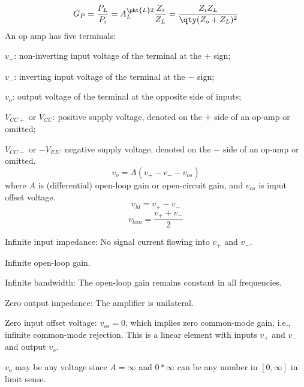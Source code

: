 \documentclass[a4paper,12pt]{report}
\begin{document}
\[G_P=\frac{P_L}{P_i}=A_L^{\pht{L}2}\frac{Z_i}{Z_L}=\frac{Z_iZ_L}{\qty(Z_o+Z_L)^2}\]
An op amp has five terminals:
\bit
\item $v_+$: non-inverting input voltage of the terminal at the $+$ sign;
\item $v_-$: inverting input voltage of the terminal at the $-$ sign;
\item $v_o$: output voltage of the terminal at the opposite side of inputs;
\item $V_{CC+}$ or $V_{CC}$: positive supply voltage, denoted on the $+$ side of an op-amp or omitted;
\item $V_{CC-}$ or $-V_{EE}$: negative supply voltage, denoted on the $-$ side of an op-amp or omitted.
\eit
\[v_o=A(v_+-v_--v_{os})\]
where $A$ is (differential) open-loop gain or open-circuit gain, and $v_{os}$ is input offset voltage.
\[v_{ld}=v_+-v_-\]
\[v_{lcm}=\frac{v_++v_-}{2}\]
\bit
\item Infinite input impedance: No signal current flowing into $v_+$ and $v_-$.
\item Infinite open-loop gain.
\item Infinite bandwidth: The open-loop gain remains constant in all frequencies.
\item Zero output impedance: The amplifier is unilateral.
\item Zero input offset voltage: $v_{os}=0$, which implies zero common-mode gain, i.e., infinite common-mode rejection.
\eit
This is a linear element with inputs $v_+$ and $v_-$ and output $v_o$.

$v_o$ may be any voltage since $A=\infty$ and $0*\infty$ can be any number in $[0,\infty]$ in limit sense.
\end{document}
